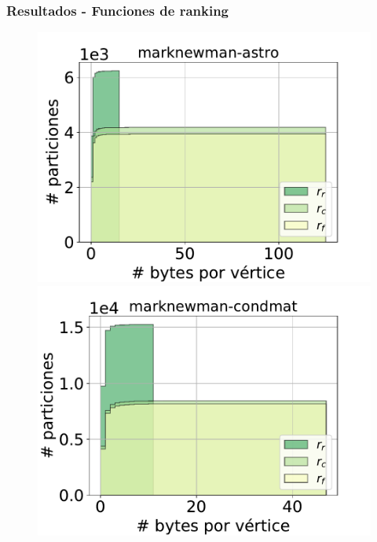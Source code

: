 \begin{frame}
\frametitle{Resultados - Funciones de ranking}

\begin{figure}
    \centering
    	\begin{minipage}{1\textwidth}
    		\centering
    		\begin{minipage}{0.45\textwidth}
    			\centering
    			\includegraphics[width=1\linewidth]{../img/cdf/marknewman-astro.pdf}
    		\end{minipage}
    		\begin{minipage}{0.45\textwidth}
    			\centering
    			\includegraphics[width=1\linewidth]{../img/cdf/marknewman-condmat.pdf}
    		\end{minipage}  		
    	\end{minipage}
    	

\end{figure}
\end{frame}
